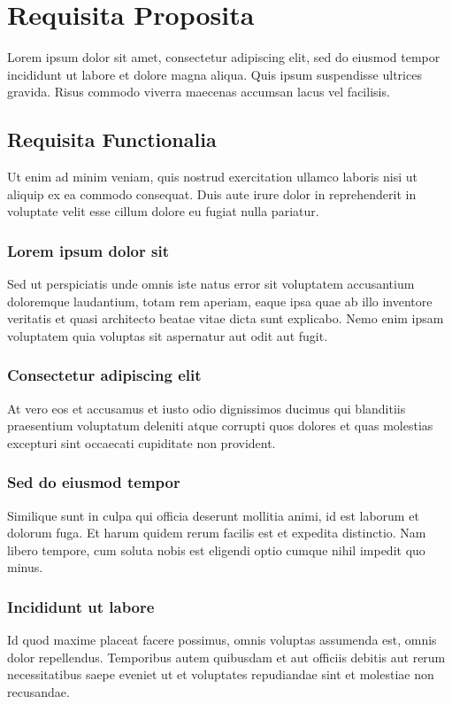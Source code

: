 \chapter{Requisita Proposita}

Lorem ipsum dolor sit amet, consectetur adipiscing elit, sed do eiusmod tempor incididunt ut labore et dolore magna aliqua. Quis ipsum suspendisse ultrices gravida. Risus commodo viverra maecenas accumsan lacus vel facilisis.

\section{Requisita Functionalia}

Ut enim ad minim veniam, quis nostrud exercitation ullamco laboris nisi ut aliquip ex ea commodo consequat. Duis aute irure dolor in reprehenderit in voluptate velit esse cillum dolore eu fugiat nulla pariatur.

\subsection{Lorem ipsum dolor sit}
Sed ut perspiciatis unde omnis iste natus error sit voluptatem accusantium doloremque laudantium, totam rem aperiam, eaque ipsa quae ab illo inventore veritatis et quasi architecto beatae vitae dicta sunt explicabo. Nemo enim ipsam voluptatem quia voluptas sit aspernatur aut odit aut fugit.

\subsection{Consectetur adipiscing elit}
At vero eos et accusamus et iusto odio dignissimos ducimus qui blanditiis praesentium voluptatum deleniti atque corrupti quos dolores et quas molestias excepturi sint occaecati cupiditate non provident.

\subsection{Sed do eiusmod tempor}
Similique sunt in culpa qui officia deserunt mollitia animi, id est laborum et dolorum fuga. Et harum quidem rerum facilis est et expedita distinctio. Nam libero tempore, cum soluta nobis est eligendi optio cumque nihil impedit quo minus.

\subsection{Incididunt ut labore}
Id quod maxime placeat facere possimus, omnis voluptas assumenda est, omnis dolor repellendus. Temporibus autem quibusdam et aut officiis debitis aut rerum necessitatibus saepe eveniet ut et voluptates repudiandae sint et molestiae non recusandae.

